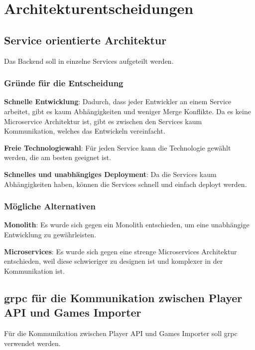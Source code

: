 \section{Architekturentscheidungen}

\subsection{Service orientierte Architektur}\label{subsec:soa}

Das Backend soll in einzelne Services aufgeteilt werden.

\subsubsection{Gründe für die Entscheidung}\label{subsubsec:grunde-fur-die-entscheidung}

\textbf{Schnelle Entwicklung}: Dadurch, dass jeder Entwickler an einem Service arbeitet, gibt es kaum Abhängigkeiten
und weniger Merge Konflikte.
Da es keine Microservice Architektur ist, gibt es zwischen den Services kaum Kommunikation, welches das Entwickeln vereinfacht.

\textbf{Freie Technologiewahl}: Für jeden Service kann die Technologie gewählt werden, die am besten geeignet ist.

\textbf{Schnelles und unabhängiges Deployment}: Da die Services kaum Abhängigkeiten haben, können die Services
schnell und einfach deployt werden.

\subsubsection{Mögliche Alternativen}\label{subsubsec:mogliche-alternativen}

\textbf{Monolith}: Es wurde sich gegen ein Monolith entschieden, um eine unabhängige Entwicklung zu gewährleisten.

\textbf{Microservices}: Es wurde sich gegen eine strenge Microservices Architektur entschieden, weil diese schwieriger
zu designen ist und komplexer in der Kommunikation ist.


\subsection{grpc für die Kommunikation zwischen Player API und Games Importer}\label{subsec:grpc-fur-die-kommunikation-zwischen-player-api-und-games-importer}

Für die Kommunikation zwischen Player API und Games Importer soll grpc verwendet werden.

